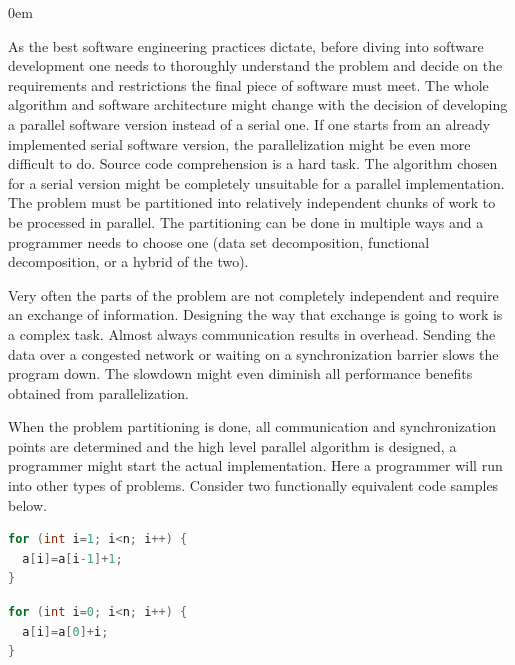 \begin{description}[style=unboxed,leftmargin=0cm]
\itemsep0em
\item[Problem understanding and partitioning] As the best software engineering practices dictate, before diving into software development one needs to thoroughly understand the problem and decide on the requirements and restrictions the final piece of software must meet. The whole algorithm and software architecture might change with the decision of developing a parallel software version instead of a serial one. If one starts from an already implemented serial software version, the parallelization might be even more difficult to do. Source code comprehension is a hard task. The algorithm chosen for a serial version might be completely unsuitable for a parallel implementation. The problem must be partitioned into relatively independent chunks of work to be processed in parallel. The partitioning can be done in multiple ways and a programmer needs to choose one (data set decomposition, functional decomposition, or a hybrid of the two).
\item[Communications and synchronization] Very often the parts of the problem are not completely independent and require an exchange of information. Designing the way that exchange is going to work is a complex task. Almost always communication results in overhead. Sending the data over a congested network or waiting on a synchronization barrier slows the program down. The slowdown might even diminish all performance benefits obtained from parallelization.
\item[Implementation and data dependencies] When the problem partitioning is done, all communication and synchronization points are determined and the high level parallel algorithm is designed, a programmer might start the actual implementation. Here a programmer will run into other types of problems. Consider two functionally equivalent code samples below.\newline\null
\begin{minipage}[t]{0.50\linewidth}
\begin{lstlisting}[caption={\raggedright Non-parallelizable loop with planted loop-carried data dependence.},label={lst:code_sample_data_dependence},language=C]
for (int i=1; i<n; i++) {
  a[i]=a[i-1]+1;
}
\end{lstlisting}
\end{minipage}
\begin{minipage}[t]{0.50\linewidth}
\begin{lstlisting}[caption={\raggedright Parallelizable loop free of any data dependencies.}, label={lst:code_sample_no_data_dependence},language=C]
for (int i=0; i<n; i++) {
  a[i]=a[0]+i;
}
\end{lstlisting}
\end{minipage}


\end{description}
